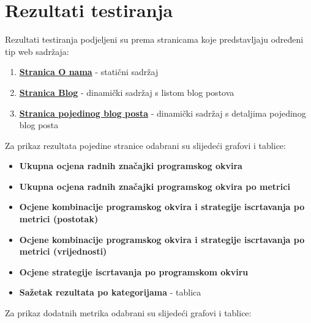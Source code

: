 \section{Rezultati testiranja}
Rezultati testiranja podjeljeni su prema stranicama koje predstavljaju određeni tip web sadržaja:

\begin{enumerate}
    \item \hyperref[sec:rezultati-o-nama]{\textbf{Stranica O nama}} - statični sadržaj
    \item \hyperref[sec:rezultati-blog]{\textbf{Stranica Blog}} - dinamički sadržaj s listom blog postova
    \item \hyperref[sec:rezultati-blog-post]{\textbf{Stranica pojedinog blog posta}} - dinamički sadržaj s detaljima pojedinog blog posta
\end{enumerate}

\bigskip
\noindent
Za prikaz rezultata pojedine stranice odabrani su slijedeći grafovi i tablice:

\begin{itemize}
    \item \textbf{Ukupna ocjena radnih značajki programskog okvira}
    \item \textbf{Ukupna ocjena radnih značajki programskog okvira po metrici}
    \item \textbf{Ocjene kombinacije programskog okvira i strategije iscrtavanja po metrici (postotak)}
    \item \textbf{Ocjene kombinacije programskog okvira i strategije iscrtavanja po metrici (vrijednosti)}
    \item \textbf{Ocjene strategije iscrtavanja po programskom okviru}
    \item \textbf{Sažetak rezultata po kategorijama} - tablica
\end{itemize}

\bigskip
\noindent
Za prikaz dodatnih metrika odabrani su slijedeći grafovi i tablice:

